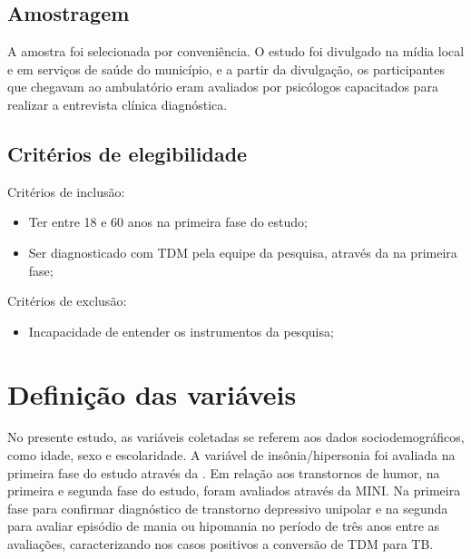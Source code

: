 \documentclass[chapter=TITLE,
               oneside,
               12pt,
               a4paper,
               english,
               brazil]{abntex2}    %
\begin{document}
        \subsection{Amostragem} 
    
            A amostra foi selecionada por conveniência. O estudo foi divulgado na mídia
            local e em serviços de saúde do município, e a partir da divulgação,
            os participantes que chegavam ao ambulatório eram avaliados por psicólogos
            capacitados para realizar a entrevista clínica diagnóstica.

        \subsection{Critérios de elegibilidade}

            Critérios de inclusão:

            \begin{itemize}

                \item Ter entre 18 e 60 anos na primeira fase do estudo;

                \item Ser diagnosticado com TDM pela equipe da pesquisa,
                    através da  na primeira fase;

            \end{itemize}

            Critérios de exclusão:

            \begin{itemize}

                \item Incapacidade de entender os instrumentos da pesquisa;

    \end{itemize}

    \section{Definição das variáveis}\label{sec:variaveis}

        No presente estudo, as variáveis coletadas se referem aos dados
        sociodemográficos, como idade, sexo e escolaridade.
        A variável de insônia/hipersonia foi avaliada na primeira fase do estudo
        através da . 
        Em relação aos transtornos de humor, na primeira e segunda fase do estudo,
        foram avaliados através da MINI. Na primeira fase para confirmar diagnóstico
        de transtorno depressivo unipolar e na segunda para avaliar episódio de mania
        ou hipomania no período de três anos entre as avaliações, caracterizando nos
        casos positivos a conversão de TDM para TB.
\end{document}
